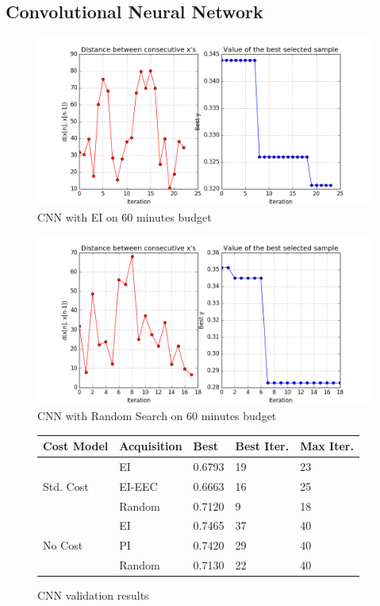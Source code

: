 \documentclass[letterpaper]{article}
\begin{document}
\subsection {Convolutional Neural Network}
\begin{figure}[!h]
	\includegraphics[width=\linewidth]{EIX_CNN_X_init2_STD_ITER60min_v2.png}
	\caption{CNN with EI on 60 minutes budget}
\end{figure}
\begin{figure}[!h]
	\includegraphics[width=\linewidth]{RAND_CNN_X_init2_STD_ITER60min_v2.png}
	\caption{CNN with Random Search on 60 minutes budget}
\end{figure}
\begin{figure}[!h]
\begin{center}
	\begin{tabular}{lllll}
		\hline
		Cost Model & Acquisition & Best & Best Iter. & Max Iter.\\
		\hline
		\multirow{3}{*}{Std. Cost} & EI &  0.6793 & 19 & 23\\
		& EI-EEC & 0.6663 & 16 & 25\\
		& Random & 0.7120 & 9 & 18\\
		\hline
		\multirow{4}{*}{No Cost} & EI & 0.7465 & 37 & 40\\
		& PI & 0.7420 & 29 & 40\\
		& Random & 0.7130 & 22 & 40\\
		\hline
	\end{tabular}
\end{center}
	\caption{CNN validation results}
\end{figure}
\end{document}
